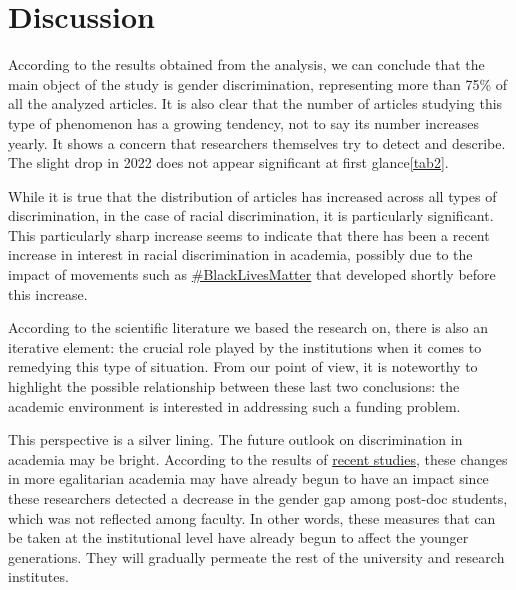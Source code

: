 \documentclass[runningheads]{llncs}
\begin{document}
\section{Discussion}
According to the results obtained from the analysis, we can conclude that the main object of the study is gender discrimination, representing more than 75\% of all the analyzed articles. It is also clear that the number of articles studying this type of phenomenon has a growing tendency, not to say its number increases yearly. It shows a concern that researchers themselves try to detect and describe. The slight drop in 2022 does not appear significant at first glance\ref{tab2}.

While it is true that the distribution of articles has increased across all types of discrimination, in the case of racial discrimination, it is particularly significant. This particularly sharp increase seems to indicate that there has been a recent increase in interest in racial discrimination in academia, possibly due to the impact of movements such as \href{https://doi.org/10.1016/j.jnma.2021.12.009}{\#BlackLivesMatter} that developed shortly before this increase.

According to the scientific literature we based the research on, there is also an iterative element: the crucial role played by the institutions when it comes to remedying this type of situation. From our point of view, it is noteworthy to highlight the possible relationship between these last two conclusions: the academic environment is interested in addressing such a funding problem.

This perspective is a silver lining. The future outlook on discrimination in academia may be bright. According to the results of \href{https://doi.org/10.1111/gwao.12549}{recent studies}, these changes in more egalitarian academia may have already begun to have an impact since these researchers detected a decrease in the gender gap among post-doc students, which was not reflected among faculty. In other words, these measures that can be taken at the institutional level have already begun to affect the younger generations. They will gradually permeate the rest of the university and research institutes.
\end{document}
